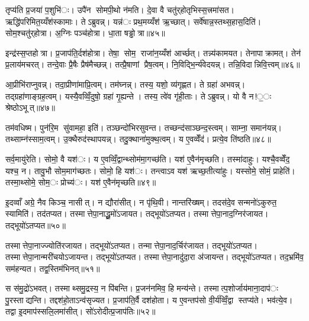 तृप्य॑ति प्र॒जया॑ प॒शुभि॑ः। उपै॑न सोमपी॒थो न॑मति। दे॒वा वै चतु॑र्‌होतृभिस्स॒त्त्रमा॑सत। ऋद्धि॑परिमित॒य्यँश॑स्कामाः। तेऽब्रुवन्न्। यन्न॑ः प्रथ॒मय्यँश॑ ऋ॒च्छात्। सर्वे॑षान्न॒स्तथ्स॒हास॒दिति॑। सोम॒श्चतु॑र्‌होत्रा। अ॒ग्निः पञ्च॑होत्रा। धा॒ता षड्ढोत्रा॥४५॥

इन्द्र॑स्स॒प्तहोत्रा। प्र॒जाप॑ति॒र्दश॑होत्रा। तेषा॒ सोम॒ राजा॑न॒य्यँश॑ आर्च्छत्। तन्न्य॑कामयत। तेनापाक्रामत्। तेन॑ प्र॒लाय॑मचरत्। तन्दे॒वाः प्रै॒षैः प्रैष॑मैच्छन्न्। तत्प्रै॒षाणां प्रैष॒त्वम्। नि॒विद्भि॒र्न्य॑वेदयन्न्। तन्नि॒विदान्निवि॒त्त्वम्॥४६॥

आ॒प्रीभि॑राप्नुवन्न्। तदा॒प्रीणा॑माप्रि॒त्वम्। तम॑घ्नन्न्। तस्य॒ यशो॒ व्य॑गृह्णत। ते ग्रहा॑ अभवन्न्। तद्ग्रहा॑णाङ्ग्रह॒त्वम्। यस्यै॒वव्विँ॒दुषो॒ ग्रहा॑ गृ॒ह्यन्ते। तस्य॒ त्वे॑व गृ॑ही॒ताः। तेऽब्रुवन्न्। यो वै न!॒ः श्रेष्ठोऽभूत्॥४७॥

तम॑वधिष्म। पुन॑रि॒म सु॑वामहा॒ इति॑। तञ्छन्दो॑भिरसुवन्त। तच्छन्द॑साञ्छन्द॒स्त्वम्। साम्ना॒ समान॑यन्न्। तथ्साम्न॑स्साम॒त्वम्। उ॒क्थैरुद॑स्थापयन्न्। तदु॒क्थाना॑मुक्थ॒त्वम्। य ए॒वव्वेँद॑। प्रत्ये॒व ति॑ष्ठति॥४८॥

सर्व॒मायु॑रेति। सोमो॒ वै यश॑ः। य ए॒वव्विँ॒द्वान्थ्सोम॑मा॒गच्छ॑ति। यश॑ ए॒वैन॑मृच्छति। तस्मा॑दाहुः। यश्चै॒वव्वेँद॒ यश्च॒ न। तावु॒भौ सोम॒माग॑च्छतः। सोमो॒ हि यश॑ः। तन्त्वाऽव यश॑ ऋच्छ॒तीत्या॑हुः। यस्सोमे॒ सोमं॒ प्राहेति॑। तस्मा॒थ्सोमे॒ सोम॒ः प्रोच्य॑ः। यश॑ ए॒वैन॑मृच्छति॥४९॥


इ॒दव्वाँ अग्रे॒ नैव किञ्च॒ नासीत्। न द्यौरा॑सीत्। न पृ॑थि॒वी। नान्तरि॑ख्षम्। तदस॑दे॒व सन्मनो॑ऽकुरुत॒ स्यामिति॑। तद॑तप्यत। तस्मात्तेपा॒नाद्धू॒मो॑ऽजायत। तद्भूयो॑ऽतप्यत। तस्मात्तेपा॒नाद॒ग्निर॑जायत। तद्भूयो॑ऽतप्यत॥५०॥

तस्मात्तेपा॒नाज्ज्योति॑रजायत। तद्भूयो॑ऽतप्यत। तन्मात्तेपा॒नाद॒र्चिर॑जायत। तद्भूयो॑ऽतप्यत। तस्मात्तेपा॒नान्मरी॑चयोऽजायन्त। तद्भूयो॑ऽतप्यत। तस्मात्तेपा॒नादु॑दा॒रा अ॑जायन्त। तद्भूयो॑ऽतप्यत। तद॒भ्रमि॑व॒ सम॑हन्यत। तद्व॒स्तिम॑भिनत्॥५१॥

स स॑मु॒द्रो॑ऽभवत्। तस्माथ्समु॒द्रस्य॒ न पि॑बन्ति। प्र॒जन॑नमिव॒ हि मन्य॑न्ते। तस्मात्प॒शोर्जाय॑माना॒दाप॑ः पु॒रस्ताद्यन्ति। तद्दश॑हो॒ताऽन्व॑सृज्यत। प्र॒जाप॑ति॒र्वै दश॑होता। य ए॒वन्तप॑सो वी॒र्य॑व्विँ॒द्वा स्तप्य॑ते। भव॑त्ये॒व। तद्वा इ॒दमाप॑स्सलि॒लमा॑सीत्। सो॑ऽरोदीत्प्र॒जाप॑तिः॥५२॥

